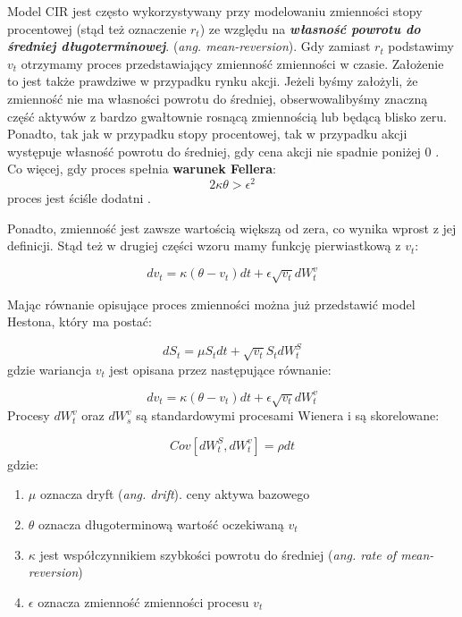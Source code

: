 \documentclass{pracamgr}
\begin{document}
Model CIR jest często wykorzystywany przy modelowaniu zmienności stopy procentowej (stąd też oznaczenie $r_t$) ze względu na \textbf{\textit{własność powrotu do średniej długoterminowej}}. 
(\textit{ang. mean-reversion}). Gdy zamiast $r_t$ podstawimy $v_t$ otrzymamy proces przedstawiający zmienność zmienności w czasie. Założenie to jest także prawdziwe w przypadku rynku 
akcji. Jeżeli byśmy założyli, że zmienność nie ma własności powrotu do średniej, obserwowalibyśmy znaczną część aktywów z bardzo gwałtownie rosnącą zmiennością lub będącą blisko zeru.
Ponadto, tak jak w przypadku stopy procentowej, tak w przypadku akcji występuje własność powrotu do średniej, gdy cena akcji nie spadnie poniżej 0 \cite{TestingMeanReversion}.
Co więcej, gdy proces spełnia \textbf{warunek Fellera}:
\begin{equation}
2 \kappa \theta > \epsilon^2
\end{equation}
proces jest ściśle dodatni \cite{TheLittleHestonTrap}.


Ponadto, zmienność jest zawsze wartością większą od zera, co wynika wprost z jej definicji. Stąd też w drugiej części wzoru mamy funkcję pierwiastkową z $v_t$: 

\begin{equation} 
dv_t  = \kappa (\theta - v_t)dt + \epsilon \sqrt{v_t} dW_t^v 
\end{equation}

Mając równanie opisujące proces zmienności można już przedstawić model Hestona, który ma postać:

\begin{equation}
dS_t  = \mu S_t dt + \sqrt{v_t} S_t dW^S_t
\end{equation}
gdzie wariancja $v_t$ jest opisana przez następujące równanie: 

\begin{equation}
dv_t  = \kappa (\theta - v_t)dt + \epsilon \sqrt{v_t} dW_t^v 
\end{equation}
Procesy $dW_t^v$ oraz $dW_s^v$ są standardowymi procesami Wienera i są skorelowane:

\begin{equation}
Cov[dW^S_t, dW^v_t] = \rho dt 
\end{equation}
gdzie:

\begin{enumerate}
\item $\mu$ oznacza dryft (\textit{ang. drift}). ceny aktywa bazowego 
\item $\theta$ oznacza długoterminową wartość oczekiwaną $v_t$
\item $\kappa$ jest współczynnikiem szybkości powrotu do średniej (\textit{ang. rate of mean-reversion})
\item $\epsilon$ oznacza zmienność zmienności procesu $v_t$
\end{enumerate}
\end{document}
